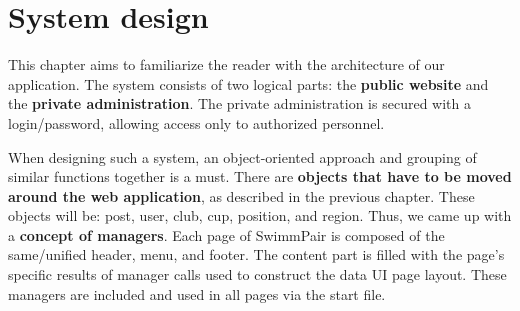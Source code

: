 \chapter{System design}
This chapter aims to familiarize the reader with the architecture of our application. The system consists of two logical parts: the \textbf{public website} and the \textbf{private administration}. The private administration is secured with a login/password, allowing access only to authorized personnel.
\par
When designing such a system, an object-oriented approach and grouping of similar functions together is a must. There are \textbf{objects that have to be moved around the web application}, as described in the previous chapter. These objects will be: post, user, club, cup, position, and region. Thus, we came up with a \textbf{concept of managers}. Each page of SwimmPair is composed of the same/unified header, menu, and footer. The content part is filled with the page’s specific results of manager calls used to construct the data UI page layout. These managers are included and used in all pages via the start file.
